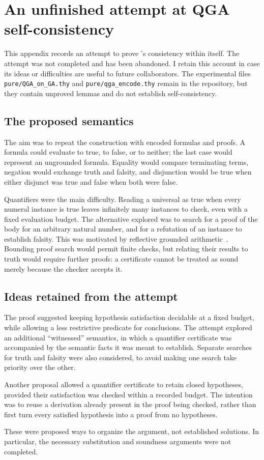 \section{An unfinished attempt at QGA self-consistency}
\label{sec:self}
\label{sec:semantics}

This appendix records an attempt to prove \QGA's consistency within
\QGA{} itself.  The attempt was not completed and has been abandoned.
I retain this account in case its ideas or difficulties are useful to
future collaborators.  The experimental files
\texttt{pure/QGA\_on\_GA.thy} and \texttt{pure/qga\_encode.thy} remain in
the repository, but they contain unproved lemmas and do not establish
\QGA{} self-consistency.

\subsection{The proposed semantics}
\label{sec:semantics:formulas}
\label{sec:semantics:quant}

The aim was to repeat the \BGA{} construction with encoded \QGA{} formulas
and proofs.  A formula could evaluate to true, to false, or to neither;
the last case would represent an ungrounded formula.  Equality would compare
terminating terms, negation would exchange truth and falsity, and
disjunction would be true when either disjunct was true and false when both
were false.

Quantifiers were the main difficulty.  Reading a universal as true when
every numeral instance is true leaves infinitely many instances to check,
even with a fixed evaluation budget.  The alternative explored was to
search for a proof of the body for an arbitrary natural number, and for
a refutation of an instance to establish falsity.  This was motivated by
reflective grounded arithmetic~\cite{ford-rga}.  Bounding proof search
would permit finite checks, but relating their results to truth would
require further proofs: a certificate cannot be treated as sound merely
because the checker accepts it.

\subsection{Ideas retained from the attempt}

The \BGA{} proof suggested keeping hypothesis satisfaction decidable at a
fixed budget, while allowing a less restrictive predicate for conclusions.
The attempt explored an additional ``witnessed'' semantics, in which a
quantifier certificate was accompanied by the semantic facts it was meant
to establish.  Separate searches for truth and falsity were also considered,
to avoid making one search take priority over the other.

Another proposal allowed a quantifier certificate to retain closed
hypotheses, provided their satisfaction was checked within a recorded
budget.  The intention was to reuse a derivation already present in the
proof being checked, rather than first turn every satisfied hypothesis
into a proof from no hypotheses.

These were proposed ways to organize the argument, not established
solutions.  In particular, the necessary substitution and soundness
arguments were not completed.
